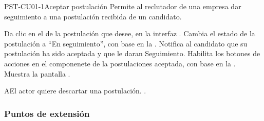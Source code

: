 \clearpage
\begin{UseCase}[]{PST-CU01-1}{Aceptar postulación}{
	Permite al reclutador de una empresa dar seguimiento a una postulación recibida de un candidato.
	}
\end{UseCase}

\begin{UCtrayectoria}
	\UCpaso [\UCactor] Da clic en el  de la postulación que desee, en la interfaz .
	\UCpaso [\UCsist] Cambia el estado de la postulación a ``En seguimiento'', con base en la .
	\UCpaso [\UCsist] Notifica al candidato que su postulación ha sido aceptada y que le daran Seguimiento.
	\UCpaso [\UCsist] Habilita los botones de acciones en el componenete  de la postulaciones aceptada, con base en la .
	\UCpaso [\UCsist] Muestra la pantalla . \label{PST-CU01:1}

\end{UCtrayectoria}


\begin{UCtrayectoriaA}{A}{El actor quiere descartar una postulación.}
	.
\end{UCtrayectoriaA} 

\subsubsection{Puntos de extensión}
